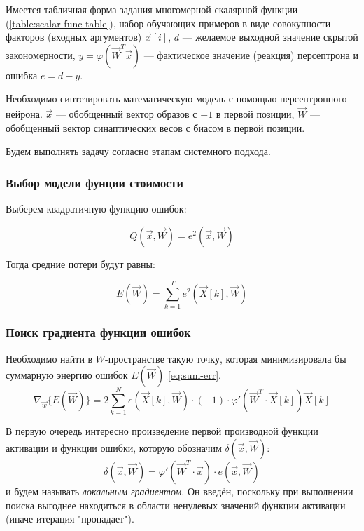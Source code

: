\documentclass{article}
\numberwithin{equation}{subsection}
\begin{document}
Имеется табличная форма задания многомерной скалярной функции (\ref{table:scalar-func-table}), 
набор обучающих примеров в виде совокупности факторов (входных аргументов) $\vec{x}[i]$, $d$ ---
желаемое выходной значение скрытой закономерности, $y = \varphi (\vec{W}^T \vec{x})$ ---
фактическое значение (реакция) персептрона и ошибка $e = d - y$.

Необходимо синтезировать математическую модель с помощью персептронного нейрона. 
$\vec{x}$ --- обобщенный вектор образов с $+1$ в первой позиции, $\vec{W}$ ---
обобщенный вектор синаптических весов с биасом в первой позиции.

Будем выполнять задачу согласно этапам системного подхода.



\subsubsection{Выбор модели фунции стоимости}

Выберем квадратичную функцию ошибок:

\begin{equation}
    Q(\vec{x}, \vec{W}) = e^2(\vec{x}, \vec{W})
\end{equation}

Тогда средние потери будут равны:
    
\begin{equation}
    E(\vec{W}) = \sum_{k=1}^{T} e^2 (\vec{X}[k], \vec{W})
    \label{eq:sum-err}
\end{equation}



\subsubsection{Поиск градиента функции ошибок}

Необходимо найти в $W$-пространстве такую точку, которая минимизировала бы суммарную 
энергию ошибок $E(\vec{W})$ \ref{eq:sum-err}.
\begin{equation}
    \nabla_{\vec{w}} \{ E(\vec{W}) \} = 2 \sum_{k=1}^{N} e (\vec{X}[k], \vec{W}) \cdot (-1)
    \cdot \varphi ' (\vec{W}^T \cdot \vec{X}[k]) \vec{X}[k]
\end{equation}

В первую очередь интересно произведение первой производной функции активации и функции ошибки, 
которую обозначим $\delta(\vec{x}, \vec{W})$:
\begin{equation}
    \delta(\vec{x}, \vec{W}) = \varphi ' (\vec{W}^{T} \cdot \vec{x}) \cdot e(\vec{x}, \vec{W})
    \label{eq:local_grad}
\end{equation}
\noindent
и будем называть \textit{локальным градиентом}. 
Он введён, поскольку при выполнении поиска выгоднее находиться в области ненулевых значений
функции активации (иначе итерация "пропадает").
\end{document}
